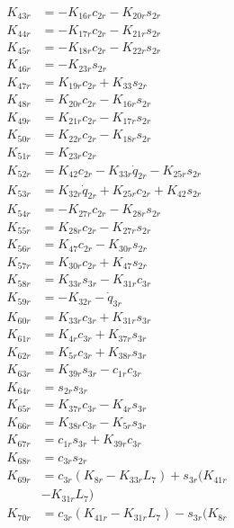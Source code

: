 \begin{multicols}{2}
\begin{align}
K_{43r} &= - K_{16r}c_{2r} - K_{20r}s_{2r} \nonumber \\
K_{44r} &= - K_{17r}c_{2r} - K_{21r}s_{2r} \nonumber \\
K_{45r} &= - K_{18r}c_{2r} - K_{22r}s_{2r} \nonumber \\
K_{46r} &= -K_{23r}s_{2r} \nonumber \\
K_{47r} &= K_{19r}c_{2r} + K_{33}s_{2r} \nonumber \\
K_{48r} &= K_{20r}c_{2r} - K_{16r}s_{2r} \nonumber \\
K_{49r} &= K_{21r}c_{2r} - K_{17r}s_{2r} \nonumber \\
K_{50r} &= K_{22r}c_{2r} - K_{18r}s_{2r} \nonumber \\
K_{51r} &= K_{23r}c_{2r} \nonumber \\
K_{52r} &= K_{42}c_{2r} - K_{33r}\dot{q}_{2r} - K_{25r}s_{2r} \nonumber \\
K_{53r} &= K_{32r}\dot{q}_{2r} + K_{25r}c_{2r} + K_{42}s_{2r} \nonumber \\
K_{54r} &= - K_{27r}c_{2r} - K_{28r}s_{2r} \nonumber \\
K_{55r} &= K_{28r}c_{2r} - K_{27r}s_{2r} \nonumber \\
K_{56r} &= K_{47}c_{2r} - K_{30r}s_{2r} \nonumber \\
K_{57r} &= K_{30r}c_{2r} + K_{47}s_{2r} \nonumber \\
K_{58r} &= K_{33r}s_{3r} - K_{31r}c_{3r} \nonumber \\
K_{59r} &= - K_{32r} - \dot{q}_{3r} \nonumber \\
K_{60r} &= K_{33r}c_{3r} + K_{31r}s_{3r} \nonumber \\
K_{61r} &= K_{4r}c_{3r} + K_{37r}s_{3r} \nonumber \\
K_{62r} &= K_{5r}c_{3r} + K_{38r}s_{3r} \nonumber \\
K_{63r} &= K_{39r}s_{3r} - c_{1r}c_{3r} \nonumber \\
K_{64r} &= s_{2r}s_{3r} \nonumber \\
K_{65r} &= K_{37r}c_{3r} - K_{4r}s_{3r} \nonumber \\
K_{66r} &= K_{38r}c_{3r} - K_{5r}s_{3r} \nonumber \\
K_{67r} &= c_{1r}s_{3r} + K_{39r}c_{3r} \nonumber \\
K_{68r} &= c_{3r}s_{2r} \nonumber \\
K_{69r} &= c_{3r}(K_{8r} - K_{33r}L_7) + s_{3r}(K_{41r}  \nonumber \\
&- K_{31r}L_7) \nonumber \\
K_{70r} &= c_{3r}(K_{41r} - K_{31r}L_7) - s_{3r}(K_{8r}  \nonumber \\

\end{align}
\end{multicols}
